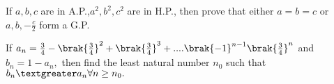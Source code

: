 		\hfill {}                             
     
	\item If $a,b,c$ are in A.P.,$a^{2},b^{2},c^{2} $ are in H.P., then prove that either $ a=b=c $ or $a,b,-\frac{c}{2}$ form a G.P. 
		                    
		\hfill {}                            

	\item If $ a_n=\frac{3}{4}-\brak{\frac{3}{4}}^{2}+\brak{\frac{3}{4}}^{3}+....\brak{-1}^{n-1}\brak{\frac{3}{4}}^{n} $ and $ b_{n}=1-a_{n}, $ then find the least natural number $n_{0}$ such that $ b_{n} \textgreater a_{n} \forall n \geq n_{0}. $ 
		             
		\hfill {}
